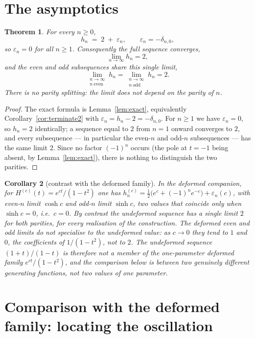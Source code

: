 \documentclass[11pt, fleqn]{amsart}
\newtheorem{theorem}{Theorem}[section]
\newtheorem{corollary}[theorem]{Corollary}
\theoremstyle{remark}
\begin{document}
\section{The asymptotics}

\begin{theorem}\label{thm:main}
For every $n\ge0$,
\[
h_n\;=\;2\;+\;\varepsilon_n,\qquad \varepsilon_n=-\delta_{n,0},
\]
so $\varepsilon_n=0$ for all $n\ge1$. Consequently the full sequence converges,
\[
\lim_{n\to\infty}h_n=2 ,
\]
and the even and odd subsequences share this single limit,
\[
\lim_{\substack{n\to\infty\\ n\ \mathrm{even}}}h_n
=\lim_{\substack{n\to\infty\\ n\ \mathrm{odd}}}h_n
=2 .
\]
There is no parity splitting: the limit does not depend on the parity of $n$.
\end{theorem}

\begin{proof}
The exact formula is Lemma~\ref{lem:exact}, equivalently
Corollary~\ref{cor:terminate2} with $\varepsilon_n=h_n-2=-\delta_{n,0}$. For $n\ge1$ we
have $\varepsilon_n=0$, so $h_n=2$ identically; a sequence equal to $2$ from $n=1$
onward converges to $2$, and every subsequence --- in particular the even-$n$ and odd-$n$
subsequences --- has the same limit $2$. Since no factor $(-1)^n$ occurs (the pole at
$t=-1$ being absent, by Lemma~\ref{lem:exact}), there is nothing to distinguish the two
parities.
\end{proof}

\begin{corollary}[contrast with the deformed family]\label{cor:contrast}
In the deformed companion, for $H^{(c)}(t)=e^{ct}/(1-t^2)$ one has
$h^{(c)}_n=\tfrac12\bigl(e^{c}+(-1)^n e^{-c}\bigr)+\varepsilon_n(c)$, with even-$n$ limit
$\cosh c$ and odd-$n$ limit $\sinh c$, two values that coincide only when $\sinh c=0$,
i.e.\ $c=0$. By contrast the undeformed sequence has a single limit $2$ for both
parities, for every realisation of the construction. The deformed even and odd limits do
not specialise to the undeformed value: as $c\to0$ they tend to $1$ and $0$, the
coefficients of $1/(1-t^2)$, not to $2$. The undeformed sequence $(1+t)/(1-t)$ is
therefore not a member of the one-parameter deformed family $e^{ct}/(1-t^2)$, and the
comparison below is between two genuinely different generating functions, not two values
of one parameter.
\end{corollary}

\section{Comparison with the deformed family: locating the oscillation}
\end{document}
